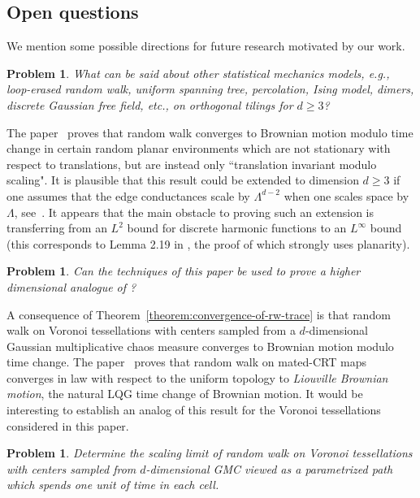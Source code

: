 \documentclass[12pt]{amsart}
\numberwithin{equation}{section}
\newcommand{\eg}{{\it e.g.}}
\newtheorem{problem}[theorem]{Problem}
\begin{document}
\subsection{Open questions}
We mention some possible directions for future research motivated by our work. 
\begin{problem} \label{problem:lerw}
	What can be said about other statistical mechanics models, \eg, loop-erased random walk, uniform spanning tree, percolation, Ising model, dimers, discrete Gaussian free field, etc., on orthogonal tilings for $d\geq 3$?
\end{problem}


The paper~\cite{GMSInvariance} proves that random walk converges to Brownian motion modulo time change in certain random planar environments which are not stationary with respect to translations, but are instead only ``translation invariant modulo scaling". It is plausible that this result could be extended to dimension $d\geq 3$ if one assumes that the edge conductances scale by $\Lambda^{d-2}$ when one scales space by $\Lambda$, see~\cite[Section 1.5]{GMSInvariance}. It appears that the main obstacle to proving such an extension is transferring from an $L^2$ bound for discrete harmonic functions to an $L^\infty$ bound (this corresponds to Lemma 2.19 in \cite{GMSInvariance}, the proof of which strongly uses planarity).


\begin{problem} \label{problem:higherdim-invariance}
Can the techniques of this paper be used to prove a higher dimensional analogue of \cite{GMSInvariance}?
\end{problem}




A consequence of Theorem~\ref{theorem:convergence-of-rw-trace} is that random walk on Voronoi tessellations with centers sampled from a $d$-dimensional Gaussian multiplicative chaos measure converges to Brownian motion modulo time change. 
The paper~\cite{GB-LBM} proves that random walk on mated-CRT maps converges in law with respect to the uniform topology to \emph{Liouville Brownian motion}, the natural LQG time change of Brownian motion. It would be interesting to establish an analog of this result for the Voronoi tessellations considered in this paper.  

\begin{problem} \label{problem:convergence-to-lqg}
Determine the scaling limit of random walk on Voronoi tessellations with centers sampled from $d$-dimensional GMC viewed as a parametrized path which spends one unit of time in each cell.
\end{problem}
\end{document}
